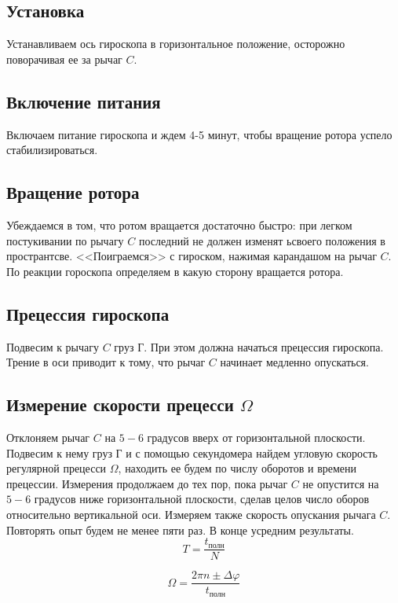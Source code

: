 \documentclass[a4paper,12pt]{article}
\begin{document}
\subsection{Установка}
Устанавливаем ось гироскопа в горизонтальное положение, осторожно поворачивая ее за рычаг $C$.

\subsection{Включение питания}
Включаем питание гироскопа и ждем 4-5 минут, чтобы вращение ротора успело стабилизироваться.

\subsection{Вращение ротора}
Убеждаемся в том, что ротом вращается достаточно быстро: при легком постукивании по рычагу $C$ последний не должен изменят ьсвоего положения в пространтсве. <<Поиграемся>> с гироском, нажимая карандашом на рычаг $C$. По реакции гороскопа определяем в какую сторону вращается ротора.

\subsection{Прецессия гироскопа}
Подвесим к рычагу $C$ груз $\text{Г}$. При этом должна начаться прецессия гироскопа. Трение в оси приводит к тому, что рычаг $C$ начинает медленно опускаться.

\subsection{Измерение скорости прецесси $\Omega$}
Отклоняем рычаг $C$ на $5-6$ градусов вверх от горизонтальной плоскости. Подвесим к нему груз $\text{Г}$ и с помощью секундомера найдем угловую скорость регулярной прецесси $\Omega$, находить ее будем по числу оборотов и времени прецессии. Измерения продолжаем до тех пор, пока рычаг $C$  не опустится на $5-6$ градусов ниже горизонтальной плоскости, сделав целов число оборов относительно вертикальной оси. Измеряем также скорость опускания рычага $C$. Повторять опыт будем не менее пяти раз. В конце усредним результаты.
\begin{equation}
		T = \frac{t_{\text{полн}}}{N}
		\label{eq:period_equation}
	\end{equation}

\begin{equation}
	\Omega = \frac{2\pi n \pm \Delta\varphi}{t_{\text{полн}}}
	\label{eq:definition_Omega}
\end{equation} 
	
\end{document}
